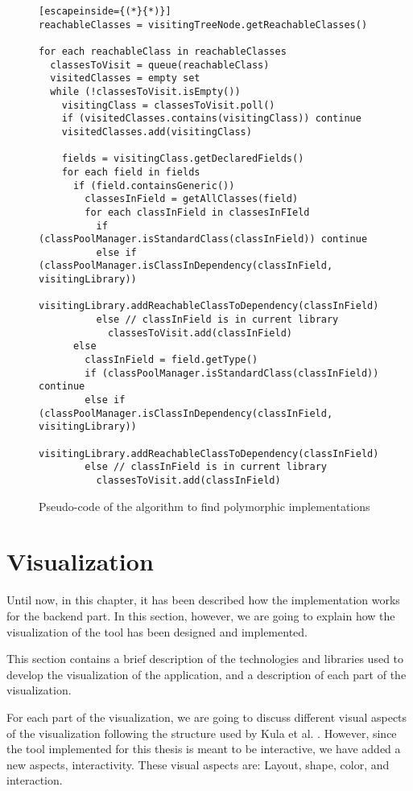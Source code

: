 \begin{figure}[ht!]
\begin{lstlisting}[escapeinside={(*}{*)}]
reachableClasses = visitingTreeNode.getReachableClasses()

for each reachableClass in reachableClasses
  classesToVisit = queue(reachableClass)
  visitedClasses = empty set
  while (!classesToVisit.isEmpty())
    visitingClass = classesToVisit.poll()
    if (visitedClasses.contains(visitingClass)) continue
    visitedClasses.add(visitingClass)

    fields = visitingClass.getDeclaredFields()
    for each field in fields
      if (field.containsGeneric())
        classesInField = getAllClasses(field)
        for each classInField in classesInFIeld
          if (classPoolManager.isStandardClass(classInField)) continue
          else if (classPoolManager.isClassInDependency(classInField, visitingLibrary))
            visitingLibrary.addReachableClassToDependency(classInField)
          else // classInField is in current library
            classesToVisit.add(classInField)
      else
        classInField = field.getType()
        if (classPoolManager.isStandardClass(classInField)) continue
        else if (classPoolManager.isClassInDependency(classInField, visitingLibrary))
          visitingLibrary.addReachableClassToDependency(classInField)
        else // classInField is in current library
          classesToVisit.add(classInField)
\end{lstlisting}
\caption{Pseudo-code of the algorithm to find polymorphic implementations}
\label{fig:calculate-tac}
\end{figure}

\section{Visualization}
Until now, in this chapter, it has been described how the implementation works for the backend part. In this section, however, we are going to explain how the visualization of the tool has been designed and implemented.

This section contains a brief description of the technologies and libraries used to develop the visualization of the application, and a description of each part of the visualization.

For each part of the visualization, we are going to discuss different visual aspects of the visualization following the structure used by Kula et al. \cite{kula2014visualizing}. However, since the tool implemented for this thesis is meant to be interactive, we have added a new aspects, interactivity. These visual aspects are: Layout, shape, color, and interaction.


